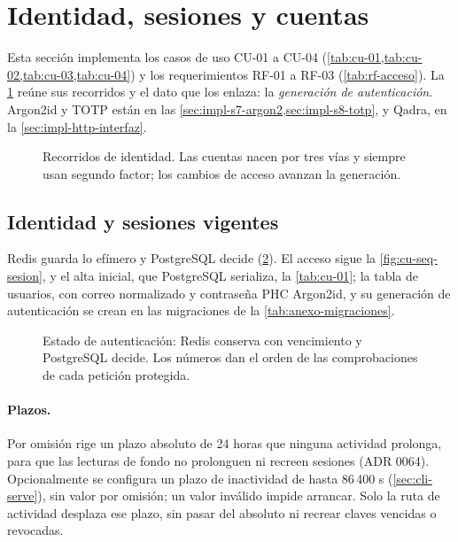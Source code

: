 
\section{Identidad, sesiones y cuentas}\label{sec:impl-identidad}

Esta sección implementa los casos de uso CU-01 a CU-04 (\cref{tab:cu-01,tab:cu-02,tab:cu-03,tab:cu-04}) y los requerimientos RF-01 a RF-03 (\cref{tab:rf-acceso}). La \cref{fig:impl-identidad-panorama} reúne sus recorridos y el dato que los enlaza: la \emph{generación de autenticación}. Argon2id y TOTP están en las \cref{sec:impl-s7-argon2,sec:impl-s8-totp}, y Qadra, en la \cref{sec:impl-http-interfaz}.

\begin{figure}[!htb]
  \centering
  
  \caption{Recorridos de identidad. Las cuentas nacen por tres vías y siempre usan segundo factor; los cambios de acceso avanzan la generación.}
  \label{fig:impl-identidad-panorama}
\end{figure}

\subsection{Identidad y sesiones vigentes}\label{sec:impl-http-identidad}

Redis guarda lo efímero y PostgreSQL decide (\cref{fig:impl-identidad-estado}). El acceso sigue la \cref{fig:cu-seq-sesion}, y el alta inicial, que PostgreSQL serializa, la \cref{tab:cu-01}; la tabla de usuarios, con correo normalizado y contraseña PHC Argon2id, y su generación de autenticación se crean en las migraciones de la \cref{tab:anexo-migraciones}.

\begin{figure}[!htb]
  \centering
  
  \caption{Estado de autenticación: Redis conserva con vencimiento y PostgreSQL decide. Los números dan el orden de las comprobaciones de cada petición protegida.}
  \label{fig:impl-identidad-estado}
\end{figure}

\paragraph{Plazos.} Por omisión rige un plazo absoluto de 24 horas que ninguna actividad prolonga, para que las lecturas de fondo no prolonguen ni recreen sesiones (ADR 0064). Opcionalmente se configura un plazo de inactividad de hasta 86\,400 s (\cref{sec:cli-serve}), sin valor por omisión; un valor inválido impide arrancar. Solo la ruta de actividad desplaza ese plazo, sin pasar del absoluto ni recrear claves vencidas o revocadas.

